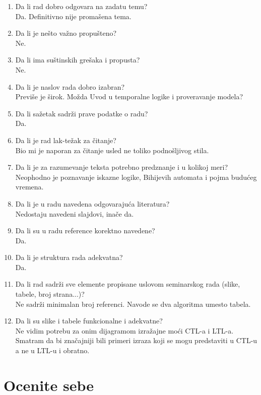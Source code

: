 \documentclass[a4paper]{report}
\begin{document}
\begin{enumerate}
\item Da li rad dobro odgovara na zadatu temu?\\
Da. Definitivno nije promašena tema.
\item Da li je nešto važno propušteno?\\
Ne.
\item Da li ima suštinskih grešaka i propusta?\\
Ne.
\item Da li je naslov rada dobro izabran?\\
Previše je širok. Možda Uvod u temporalne logike i proveravanje modela?
\item Da li sažetak sadrži prave podatke o radu?\\
Da.
\item Da li je rad lak-težak za čitanje?\\
Bio mi je naporan za čitanje usled ne toliko podnošljivog stila.
\item Da li je za razumevanje teksta potrebno predznanje i u kolikoj meri?\\
Neophodno je poznavanje iskazne logike, Bihijevih automata i pojma budućeg vremena.
\item Da li je u radu navedena odgovarajuća literatura?\\
Nedostaju navedeni slajdovi, inače da.
\item Da li su u radu reference korektno navedene?\\
Da.
\item Da li je struktura rada adekvatna?\\
Da.
\item Da li rad sadrži sve elemente propisane uslovom seminarskog rada (slike, tabele, broj strana...)?\\
Ne sadrži minimalan broj referenci. Navode se dva algoritma umesto tabela.
\item Da li su slike i tabele funkcionalne i adekvatne?\\
Ne vidim potrebu za onim dijagramom izražajne moći CTL-a i LTL-a. Smatram da bi značajniji bili
primeri izraza koji se mogu predstaviti u CTL-u a ne u LTL-u i obratno.
\end{enumerate}

\section{Ocenite sebe}
\end{document}
